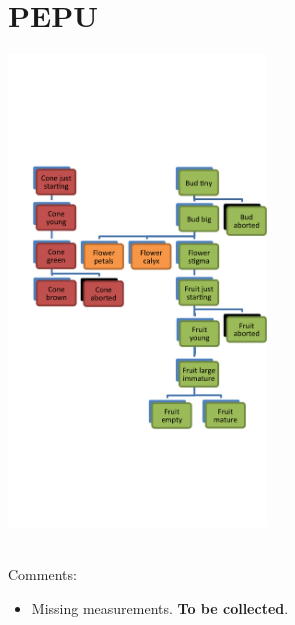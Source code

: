 \documentclass[10pt]{book} %
\begin{document}
\section{PEPU}
\begin{multicols}{2}
\includegraphics[width=2.7in]{PEPU.png}
\vfill
\columnbreak

\\Comments:
\begin{itemize}
\item Missing measurements. \textbf{To be collected}.
\end{itemize}

\end{multicols}
\clearpage
\newpage


\clearpage
\newpage
\end{document}
